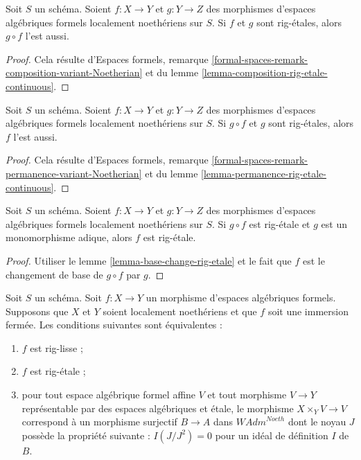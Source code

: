 \begin{lemma}
\label{lemma-composition-rig-etale}
Soit $S$ un schéma. Soient $f : X \to Y$ et $g : Y \to Z$
des morphismes d'espaces algébriques formels localement noethériens sur $S$.
Si $f$ et $g$ sont rig-étales, alors $g \circ f$ l'est aussi.
\end{lemma}

\begin{proof}
Cela résulte d'Espaces formels, remarque
\ref{formal-spaces-remark-composition-variant-Noetherian}
et du lemme \ref{lemma-composition-rig-etale-continuous}.
\end{proof}

\begin{lemma}
\label{lemma-rig-etale-permanence}
Soit $S$ un schéma. Soient $f : X \to Y$ et $g : Y \to Z$
des morphismes d'espaces algébriques formels localement noethériens sur $S$.
Si $g \circ f$ et $g$ sont rig-étales, alors $f$ l'est aussi.
\end{lemma}

\begin{proof}
Cela résulte d'Espaces formels, remarque
\ref{formal-spaces-remark-permanence-variant-Noetherian}
et du lemme \ref{lemma-permanence-rig-etale-continuous}.
\end{proof}

\begin{lemma}
\label{lemma-rig-etale-alternative-permanence}
Soit $S$ un schéma. Soient $f : X \to Y$ et $g : Y \to Z$
des morphismes d'espaces algébriques formels localement noethériens sur $S$.
Si $g \circ f$ est rig-étale et $g$ est un monomorphisme adique, alors
$f$ est rig-étale.
\end{lemma}

\begin{proof}
Utiliser le lemme \ref{lemma-base-change-rig-etale} et le fait que
$f$ est le changement de base de $g \circ f$ par $g$.
\end{proof}

\begin{lemma}
\label{lemma-closed-immersion-rig-smooth}
Soit $S$ un schéma. Soit $f : X \to Y$ un morphisme d'espaces algébriques
formels. Supposons que $X$ et $Y$ soient localement noethériens et que $f$ soit une
immersion fermée. Les conditions suivantes sont équivalentes :
\begin{enumerate}
\item $f$ est rig-lisse ;
\item $f$ est rig-étale ;
\item pour tout espace algébrique formel affine $V$ et tout morphisme
$V \to Y$ représentable par des espaces algébriques et étale,
le morphisme $X \times_Y V \to V$ correspond à un morphisme surjectif
$B \to A$ dans $\textit{WAdm}^{Noeth}$ dont le noyau $J$ possède la propriété
suivante : $I(J/J^2) = 0$ pour un idéal de définition $I$ de $B$.
\end{enumerate}
\end{lemma}


